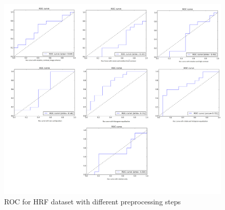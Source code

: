 \begin{figure}[!htbbp]
\centering
\includegraphics[width=1.0\textwidth]{Figures/hrf.png}
\caption{ROC for HRF dataset with different preprocessing steps}
\label{hrfroc}
\end{figure}